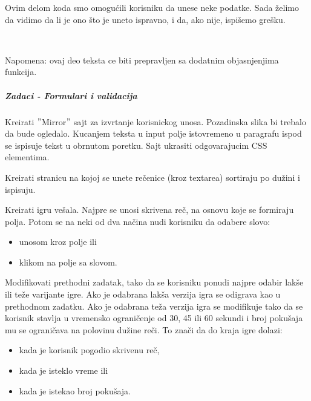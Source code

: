 Ovim delom koda smo omogućili korisniku da unese neke podatke.
Sada želimo da vidimo da li je ono što je uneto ispravno, i da, ako nije, ispišemo grešku.
\begin{lstlisting}[backgroundcolor = \color{lightgray}, breaklines=true]


\end{lstlisting}
Napomena: ovaj deo teksta ce biti prepravljen sa dodatnim objasnjenjima funkcija.

\subparagraph{Zadaci - Formulari i validacija}

\begin{primer}
Kreirati $"$Mirror$"$ sajt za izvrtanje korisnickog unosa. Pozadinska slika bi trebalo da bude
ogledalo. Kucanjem teksta u input polje istovremeno u paragrafu ispod se ispisuje tekst u 
obrnutom poretku. Sajt ukrasiti odgovarajucim CSS elementima.
\end{primer}

\begin{primer}
Kreirati stranicu na kojoj se unete rečenice (kroz textarea) sortiraju po dužini i ispisuju.
\end{primer}

\begin{primer}
Kreirati igru vešala. Najpre se unosi skrivena reč, na osnovu koje se formiraju polja. Potom se na neki od dva načina nudi korisniku da odabere slovo:
\begin{itemize}
\item unosom kroz polje ili
\item klikom na polje sa slovom.
\end{itemize}

\end{primer}

\begin{primer}
Modifikovati prethodni zadatak, tako da se korisniku ponudi najpre odabir lakše ili teže varijante igre. Ako je odabrana lakša verzija igra se odigrava kao u prethodnom zadatku.  Ako je odabrana teža verzija igra se modifikuje tako da se korisnik stavlja u vremensko ograničenje od 30, 45 ili 60 sekundi i broj pokušaja mu se ograničava na polovinu dužine reči. To znači da do kraja igre dolazi:
\begin{itemize}
\item kada je korisnik pogodio skrivenu reč,
\item kada je isteklo vreme ili
\item kada je istekao broj pokušaja.
\end{itemize}
\end{primer}

